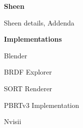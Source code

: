 \begin{list}{-}{}
\begin{list}{-}{}
    \end{list}
    \item \textbf{Sheen}
    \begin{list}{-}{}
        \item Sheen details, Addenda \cite{burley_physically_2012}
    \end{list}
    \item \textbf{Implementations}
    \begin{list}{-}{}
        \item Blender \cite{blender_foundation_blender_2022}
        \item BRDF Explorer \cite{disney_studios_brdf_2022}
        \item SORT Renderer \cite{jiayincao_sort_2022}
        \item PBRTv3 Implementation \cite{matt_pharr_pbrt_2022}
        \item Nvisii \cite{nathan_morrical_and_jonathan_tremblay_and_yunzhi_lin_and_stephen_tyree_and_stan_birchfield_and_valerio_pascucci_and_ingo_wald_nvisii_2022}
    \end{list}
\end{list}
